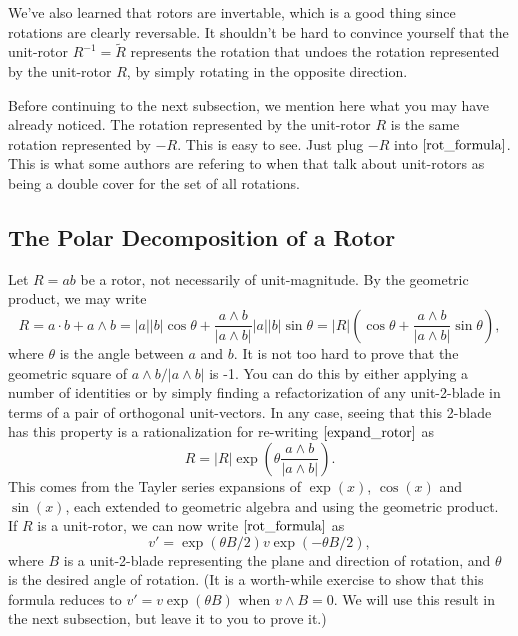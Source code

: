 \documentclass{article}
\begin{document}
We've also learned that rotors are invertable, which is a good thing
since rotations are clearly reversable.  It shouldn't be hard to convince
yourself that the unit-rotor $R^{-1}=\tilde{R}$ represents the rotation that undoes
the rotation represented by the unit-rotor $R$, by simply rotating in the opposite direction.

Before continuing to the next subsection, we mention here what you may
have already noticed.  The rotation represented by the unit-rotor $R$
is the same rotation represented by $-R$.  This is easy to see.  Just
plug $-R$ into $\eqref{rot_formula}$.  This is what some authors are
refering to when that talk about unit-rotors as being a double cover
for the set of all rotations.

\subsection{The Polar Decomposition of a Rotor}

Let $R=ab$ be a rotor, not necessarily of unit-magnitude.
By the geometric product, we may write
\begin{equation}\label{expand_rotor}
R = a\cdot b + a\wedge b = |a||b|\cos\theta + \frac{a\wedge b}{|a\wedge b|}|a||b|\sin\theta
 = |R|\left(\cos\theta + \frac{a\wedge b}{|a\wedge b|}\sin\theta\right),
\end{equation}
where $\theta$ is the angle between $a$ and $b$.  It is not too hard to
prove that the geometric square of $a\wedge b/|a\wedge b|$ is -1.  You can do
this by either applying a number of identities or by simply finding a refactorization
of any unit-2-blade in terms of a pair of orthogonal unit-vectors.  In any case,
seeing that this 2-blade has this property is a rationalization for re-writing
$\eqref{expand_rotor}$ as
\begin{equation*}
R = |R|\exp\left(\theta\frac{a\wedge b}{|a\wedge b|}\right).
\end{equation*}
This comes from the Tayler series expansions of $\exp(x)$, $\cos(x)$ and $\sin(x)$, each
extended to geometric algebra and using the geometric product.
If $R$ is a unit-rotor, we can now write $\eqref{rot_formula}$ as
\begin{equation*}
v' = \exp(\theta B/2)v\exp(-\theta B/2),
\end{equation*}
where $B$ is a unit-2-blade representing the plane and direction of rotation,
and $\theta$ is the desired angle of rotation.  (It is a worth-while exercise
to show that this formula reduces to $v'=v\exp(\theta B)$ when $v\wedge B=0$.
We will use this result in the next subsection, but leave it to you to prove it.)
\end{document}
